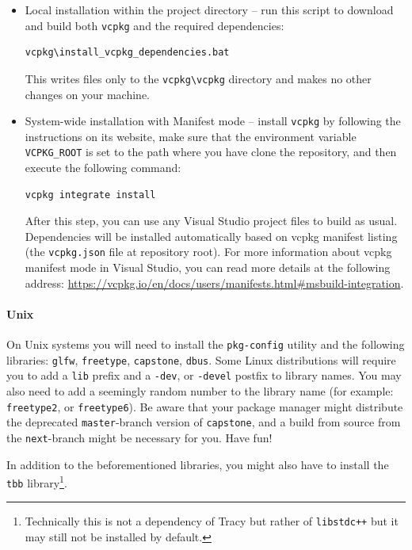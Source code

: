 \documentclass[hidelinks,titlepage,a4paper]{article}
\begin{document}
\begin{itemize}
\item Local installation within the project directory -- run this script to download and build both \texttt{vcpkg} and the required dependencies:
\begin{lstlisting}[language=sh]
vcpkg\install_vcpkg_dependencies.bat
\end{lstlisting}
This writes files only to the \texttt{vcpkg\textbackslash{}vcpkg} directory and makes no other changes on your machine.
\item System-wide installation with Manifest mode -- install \texttt{vcpkg} by following the instructions on its website, make sure that the environment variable \texttt{VCPKG\_ROOT} is set to the path where you have clone the repository, and then execute the following command:
\begin{lstlisting}[language=sh]
vcpkg integrate install
\end{lstlisting}
After this step, you can use any Visual Studio project files to build as usual.
Dependencies will be installed automatically based on vcpkg manifest listing (the \texttt{vcpkg.json} file at repository root).
For more information about vcpkg manifest mode in Visual Studio, you can read more details at the following address: \url{https://vcpkg.io/en/docs/users/manifests.html#msbuild-integration}.
\end{itemize}

\paragraph{Unix}

On Unix systems you will need to install the \texttt{pkg-config} utility and the following libraries: \texttt{glfw}, \texttt{freetype}, \texttt{capstone}, \texttt{dbus}. Some Linux distributions will require you to add a \texttt{lib} prefix and a \texttt{-dev}, or \texttt{-devel} postfix to library names. You may also need to add a seemingly random number to the library name (for example: \texttt{freetype2}, or \texttt{freetype6}). Be aware that your package manager might distribute the deprecated \texttt{master}-branch version of \texttt{capstone}, and a build from source from the \texttt{next}-branch might be necessary for you. Have fun!

In addition to the beforementioned libraries, you might also have to install the \texttt{tbb} library\footnote{Technically this is not a dependency of Tracy but rather of \texttt{libstdc++} but it may still not be installed by default.}.
\end{document}

